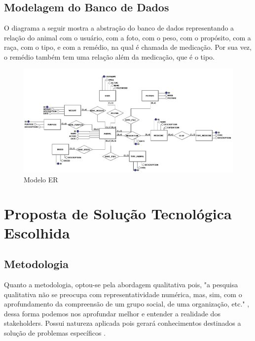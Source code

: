 \documentclass[12pt]{article}
\begin{document}
\begin{titlepage}
\begin{figure}[!h]
\begin{center}
		\end{center}
	\end{figure}

	\newpage

	\subsection{Modelagem do Banco de Dados}

	O diagrama a seguir mostra a abstração do banco de dados representando a relação do animal com o usuário, com a foto, com o peso, com o propósito, com a raça, com o tipo, e com a remédio, na qual é chamada de medicação. Por sua vez, o remédio também tem uma relação além da medicação, que é o tipo.  

	\begin{figure}[!h]
		\begin{center}
			\caption{Modelo ER}
			\includegraphics[width=6in]{img/erdoboi.jpeg}


		\end{center}
	\end{figure}

	\newpage

	\section{Proposta de Solução Tecnológica Escolhida}

	\subsection{Metodologia}

	Quanto a metodologia, optou-se pela abordagem qualitativa pois, "a pesquisa qualitativa não se preocupa com representatividade numérica, mas, sim, com o aprofundamento da compreensão de um grupo social, de uma organização, etc." \cite{ufrgs09}, dessa forma podemos nos aprofundar melhor e entender a realidade dos stakeholders. Possui natureza aplicada pois gerará conhecimentos destinados a solução de problemas específicos \cite{ufrgs09} .


\end{titlepage}
\end{document}
